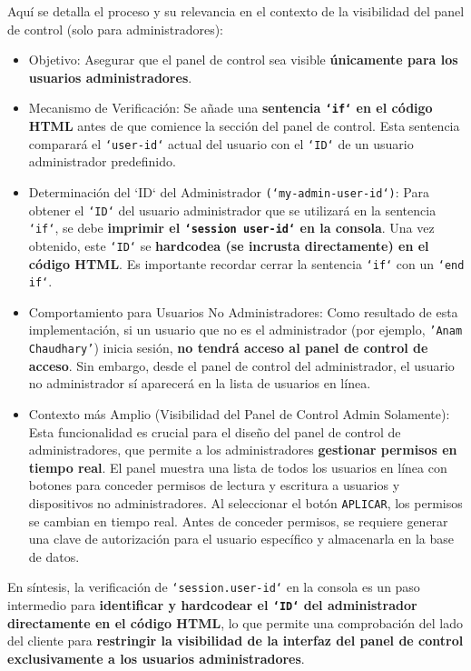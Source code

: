 \documentclass{report}
\begin{document}
Aquí se detalla el proceso y su relevancia en el contexto de la visibilidad del panel de control (solo para administradores):
\begin{itemize}
    \item Objetivo: Asegurar que el panel de control sea visible \textbf{únicamente para los usuarios administradores}.
    \item Mecanismo de Verificación: Se añade una \textbf{sentencia \texttt{`if`} en el código HTML} antes de que comience la sección del panel de control. 
          Esta sentencia comparará el \texttt{`user-id`} actual del usuario con el \texttt{`ID`} de un usuario administrador predefinido.
    \item Determinación del `ID` del Administrador \texttt{(`my-admin-user-id`)}: Para obtener el \texttt{`ID`} del usuario administrador que se utilizará 
          en la sentencia \texttt{`if`}, se debe \textbf{imprimir el \texttt{`session user-id`} en la consola}. Una vez obtenido, este \texttt{`ID`} se
          \textbf{hardcodea (se incrusta directamente) en el código HTML}. Es importante recordar cerrar la sentencia \texttt{`if`} con un \texttt{`end if`}.
    \item Comportamiento para Usuarios No Administradores: Como resultado de esta implementación, si un usuario que no es el administrador (por ejemplo, 
          \texttt{'Anam Chaudhary'}) inicia sesión, \textbf{no tendrá acceso al panel de control de acceso}. Sin embargo, desde el panel de control del 
          administrador, el usuario no administrador sí aparecerá en la lista de usuarios en línea.
    \item Contexto más Amplio (Visibilidad del Panel de Control Admin Solamente): Esta funcionalidad es crucial para el diseño del panel de control de 
          administradores, que permite a los administradores \textbf{gestionar permisos en tiempo real}. El panel muestra una lista de todos los usuarios 
          en línea con botones para conceder permisos de lectura y escritura a usuarios y dispositivos no administradores. Al seleccionar el botón 
          \texttt{APLICAR}, los permisos se cambian en tiempo real. Antes de conceder permisos, se requiere generar una clave de autorización para el 
          usuario específico y almacenarla en la base de datos.
\end{itemize}

En síntesis, la verificación de \texttt{`session.user-id`} en la consola es un paso intermedio para \textbf{identificar y hardcodear el \texttt{`ID`} 
del administrador directamente en el código HTML}, lo que permite una comprobación del lado del cliente para \textbf{restringir la visibilidad de la 
interfaz del panel de control exclusivamente a los usuarios administradores}.
\end{document}
